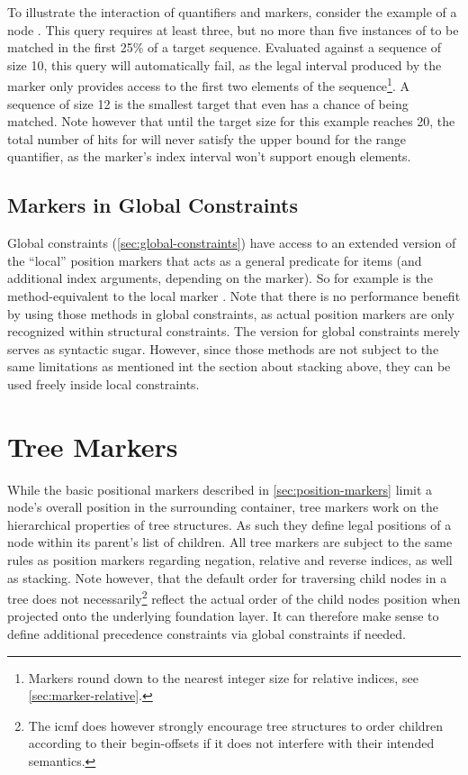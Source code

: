 \documentclass[11pt,a4paper]{report}
\begin{document}
To illustrate the interaction of quantifiers and markers, consider the example of a node .
This query requires at least three, but no more than five instances of  to be matched in the first 25\% of a target sequence.
Evaluated against a sequence of size 10, this query will automatically fail, as the legal interval produced by the marker only provides access to the first two elements of the sequence\footnote{Markers round down to the nearest integer size for relative indices, see \cref{sec:marker-relative}.}.
A sequence of size 12 is the smallest target that even has a chance of being matched.
Note however that until the target size for this example reaches 20, the total number of hits for  will never satisfy the upper bound for the range quantifier, as the marker's index interval won't support enough elements.

\subsection{Markers in Global Constraints}
\label{sec:marker-global}
Global constraints (\ref{sec:global-constraints}) have access to an extended version of the ``local'' position markers that acts as a general predicate for items (and additional index arguments, depending on the marker).
So for example  is the method-equivalent to the local marker \query{[\$x: isLast,]}.
Note that there is no performance benefit by using those methods in global constraints, as actual position markers are only recognized within structural constraints.
The version for global constraints merely serves as syntactic sugar.
However, since those methods are not subject to the same limitations as mentioned int the section about stacking above, they can be used freely inside local constraints.

\section{Tree Markers}
\label{sec:tree-markers}

While the basic positional markers described in \cref{sec:position-markers} limit a node's overall position in the surrounding container, tree markers work on the hierarchical properties of tree structures.
As such they define legal positions of a node within its parent's list of children.
All tree markers are subject to the same rules as position markers regarding negation, relative and reverse indices, as well as stacking.
Note however, that the default order for traversing child nodes in a tree does not necessarily\footnote{The \ac{icmf} does however strongly encourage tree structures to order children according to their begin-offsets if it does not interfere with their intended semantics.} reflect the actual order of the child nodes position when projected onto the underlying foundation layer.
It can therefore make sense to define additional precedence constraints via global constraints if needed.
\end{document}
